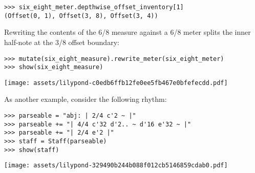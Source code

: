 \begin{comment}
<abjad>
six_eight_meter.depthwise_offset_inventory[1]
</abjad>
\end{comment}

\begin{abjadbookoutput}
\begin{singlespacing}
\vspace{-0.5\baselineskip}
\begin{verbatim}
>>> six_eight_meter.depthwise_offset_inventory[1]
(Offset(0, 1), Offset(3, 8), Offset(3, 4))
\end{verbatim}
\end{singlespacing}
\end{abjadbookoutput}

\noindent Rewriting the contents of the 6/8 measure against a 6/8 meter splits
the inner half-note at the 3/8 offset boundary:

\begin{comment}
<abjad>
mutate(six_eight_measure).rewrite_meter(six_eight_meter)
show(six_eight_measure)
</abjad>
\end{comment}

\begin{abjadbookoutput}
\begin{singlespacing}
\vspace{-0.5\baselineskip}
\begin{verbatim}
>>> mutate(six_eight_measure).rewrite_meter(six_eight_meter)
>>> show(six_eight_measure)
\end{verbatim}
\noindent\texttt{[image: assets/lilypond-c0edb6ffb12fe0ee5fb467e0bfefecdd.pdf]}
\end{singlespacing}
\end{abjadbookoutput}

\noindent As another example, consider the following rhythm:

\begin{comment}
<abjad>
parseable = "abj: | 2/4 c'2 ~ |"
parseable += "| 4/4 c'32 d'2.. ~ d'16 e'32 ~ |"
parseable += "| 2/4 e'2 |"
staff = Staff(parseable)
show(staff)
</abjad>
\end{comment}

\begin{abjadbookoutput}
\begin{singlespacing}
\vspace{-0.5\baselineskip}
\begin{verbatim}
>>> parseable = "abj: | 2/4 c'2 ~ |"
>>> parseable += "| 4/4 c'32 d'2.. ~ d'16 e'32 ~ |"
>>> parseable += "| 2/4 e'2 |"
>>> staff = Staff(parseable)
>>> show(staff)
\end{verbatim}
\noindent\texttt{[image: assets/lilypond-329490b244b088f012cb5146859cdab0.pdf]}
\end{singlespacing}
\end{abjadbookoutput}

